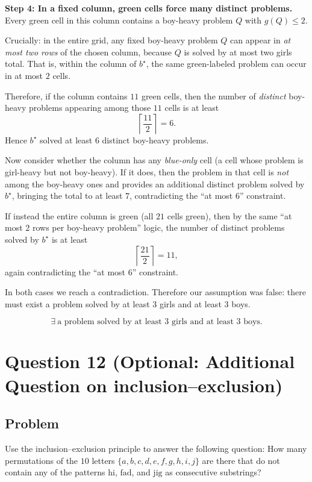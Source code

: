 \documentclass[12pt]{article}
\begin{document}
\medskip
\noindent\textbf{Step 4: In a fixed column, green cells force many distinct problems.}
Every green cell in this column contains a boy-heavy problem $Q$ with $g(Q)\le 2$.

Crucially: in the entire grid, any fixed boy-heavy problem $Q$ can appear in \emph{at most two rows} of the chosen column, because $Q$ is solved by at most two girls total. That is, within the column of $b^\star$, the same green-labeled problem can occur in at most $2$ cells.

Therefore, if the column contains $11$ green cells, then the number of \emph{distinct} boy-heavy problems appearing among those $11$ cells is at least
\[
\left\lceil \frac{11}{2}\right\rceil = 6.
\]
Hence $b^\star$ solved at least $6$ distinct boy-heavy problems.

Now consider whether the column has any \emph{blue-only} cell (a cell whose problem is girl-heavy but not boy-heavy). If it does, then the problem in that cell is \emph{not} among the boy-heavy ones and provides an additional distinct problem solved by $b^\star$, bringing the total to at least $7$, contradicting the ``at most $6$'' constraint.

If instead the entire column is green (all $21$ cells green), then by the same ``at most $2$ rows per boy-heavy problem'' logic, the number of distinct problems solved by $b^\star$ is at least
\[
\left\lceil \frac{21}{2}\right\rceil = 11,
\]
again contradicting the ``at most $6$'' constraint.

In both cases we reach a contradiction. Therefore our assumption was false: there must exist a problem solved by at least $3$ girls and at least $3$ boys.

\[
\boxed{\exists\ \text{a problem solved by at least }3\text{ girls and at least }3\text{ boys.}}
\]

\newpage

\section{Question 12 (Optional: Additional Question on inclusion--exclusion)}
\subsection{Problem}
Use the inclusion--exclusion principle to answer the following question:
How many permutations of the $10$ letters $\{a,b,c,d,e,f,g,h,i,j\}$ are there that do not contain any of the patterns $\text{hi}$, $\text{fad}$, and $\text{jig}$ as consecutive substrings?
\end{document}
